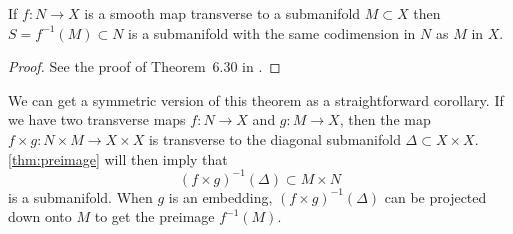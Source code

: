 \begin{theorem}\label{thm:preimage}
	If $f : N \to X$ is a smooth map transverse to a submanifold $M\subset X$ then $S=f^{-1}(M)\subset N$ is a submanifold with the same codimension in $N$ as $M$ in $X$.
\end{theorem}
\begin{proof}
	See the proof of Theorem~6.30 in \cite{lee2013smooth}.
\end{proof}

\begin{remark}\label{rmk:symmetric-preimage-theorem}
	We can get a symmetric version of this theorem as a straightforward corollary. If we have two transverse maps $f : N\to X$ and $g : M\to X$, then the map $f\times g : N\times M \to X\times X$ is transverse to the diagonal submanifold $\Delta\subset X\times X$. \cref{thm:preimage} will then imply that
	\[
		(f\times g)^{-1}(\Delta) \subset M\times N
	\]
	is a submanifold. When $g$ is an embedding, $(f\times g)^{-1}(\Delta)$ can be projected down onto $M$ to get the preimage $f^{-1}(M)$.
\end{remark}


